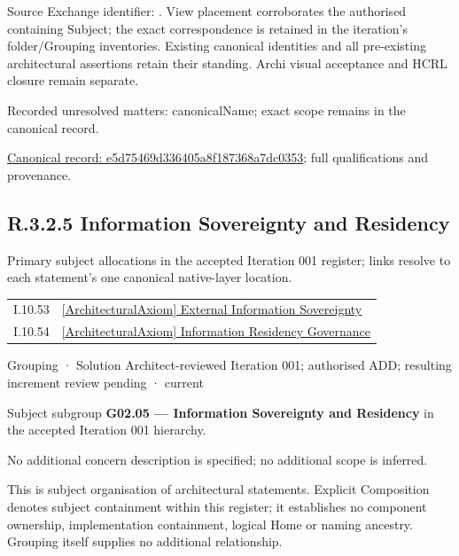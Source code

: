 Source Exchange identifier: \texttt{}. View placement corroborates
the authorised containing Subject; the exact correspondence is retained in the
iteration's folder/Grouping inventories. Existing canonical identities and all
pre-existing architectural assertions retain their standing. Archi visual
acceptance and HCRL closure remain separate.


{\small Recorded unresolved matters: canonicalName; exact scope remains in the canonical record.}\par
{\footnotesize \href{../../../../continuum/grouping/e5d75469d336405a8f187368a7dc0353.md}{Canonical record: e5d75469d336405a8f187368a7dc0353}; full qualifications and provenance.}\par
\subsection*{R.3.2.5 Information Sovereignty and Residency}
\label{navigation:R.3.2.5}

Primary subject allocations in the accepted Iteration 001 register; links resolve to each statement’s one canonical native-layer location.\par
\begin{longtable}{p{.22\linewidth}p{.73\linewidth}}
I.10.53 & \hyperref[element:aa179ef5bdf44b4eab3f2c855a8798d2]{[ArchitecturalAxiom] External Information Sovereignty} \\
I.10.54 & \hyperref[element:349f526a401e4e299b854cbfedad0fca]{[ArchitecturalAxiom] Information Residency Governance} \\
\end{longtable}
\label{element:f4af2b5206264a6fa4c5040324ad272c}
{\small Grouping · Solution Architect-reviewed Iteration 001; authorised ADD; resulting increment review pending · current}\par

Subject subgroup \textbf{G02.05 — Information Sovereignty and Residency} in the accepted Iteration 001 hierarchy.



No additional concern description is specified; no additional scope is inferred.



This is subject organisation of architectural statements. Explicit Composition denotes subject containment within this register; it establishes no component ownership, implementation containment, logical Home or naming ancestry. Grouping itself supplies no additional relationship.


